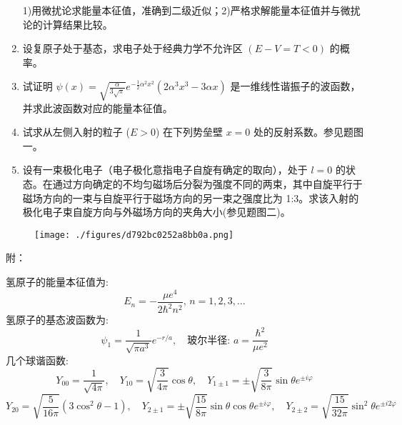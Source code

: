 \begin{enumerate}
    1)用微扰论求能量本征值，准确到二级近似；2)严格求解能量本征值并与微扰论的计算结果比较。\\
    \item 设复原子处于基态，求电子处于经典力学不允许区 $(E - V = T < 0)$ 的概率。
    \item 试证明 $\psi(x) = \sqrt{\frac{\alpha}{3\sqrt{\pi}}} e^{-\frac{1}{2}\alpha^2 x^2} (2\alpha^3 x^3 - 3\alpha x)$ 是一维线性谐振子的波函数，并求此波函数对应的能量本征值。
    \item 试求从左侧入射的粒子 ($E > 0$) 在下列势垒壁 $x = 0$ 处的反射系数。参见题图一。
    \item 设有一束极化电子（电子极化意指电子自旋有确定的取向），处于 $l = 0$ 的状态。在通过方向确定的不均匀磁场后分裂为强度不同的两束，其中自旋平行于磁场方向的一束与自旋平行于磁场方向的另一束之强度比为 1:3。求该入射的极化电子束自旋方向与外磁场方向的夹角大小(参见题图二)。
\end{enumerate}
\begin{figure}[ht]
\centering
\texttt{[image: ./figures/d792bc0252a8bb0a.png]}
\caption{} \label{fig_NJUST4_1}
\end{figure}
附：

氢原子的能量本征值为:
\[E_n = -\frac{\mu e^4}{2\hbar^2 n^2}, \, n=1,2,3,\ldots~\]
氢原子的基态波函数为:\[\psi_1 = \frac{1}{\sqrt{\pi a^3}} e^{-r/a}, \quad \text{玻尔半径: } a = \frac{\hbar^2}{\mu e^2}~\]
几个球谐函数:\[Y_{00} = \frac{1}{\sqrt{4\pi}}, \quad Y_{10} = \sqrt{\frac{3}{4\pi}} \cos \theta, \quad Y_{1\pm1} = \pm \sqrt{\frac{3}{8\pi}} \sin \theta e^{\pm i\varphi}~\]
\[Y_{20} = \sqrt{\frac{5}{16\pi}} (3\cos^2 \theta - 1), \quad Y_{2\pm1} = \pm \sqrt{\frac{15}{8\pi}} \sin \theta \cos \theta e^{\pm i\varphi}, \quad Y_{2\pm2} = \sqrt{\frac{15}{32\pi}} \sin^2 \theta e^{\pm i 2\varphi}~\]